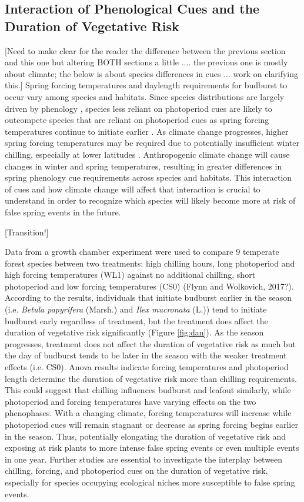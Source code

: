 \documentclass{article}\usepackage[]{graphicx}\usepackage[]{color}
\begin{document}
\subsection{Interaction of Phenological Cues and the Duration of Vegetative Risk}
[Need to make clear for the reader the difference between the previous section and this one but altering BOTH sections a little .... the previous one is mostly about climate; the below is about species differences in cues ... work on clarifying this.]
Spring forcing temperatures and daylength requirements for budburst to occur vary among species and habitats. Since species distributions are largely driven by phenology \citep{Chuine2001}, species less reliant on photoperiod cues are likely to outcompete species that are reliant on photoperiod cues as spring forcing temperatures continue to initiate earlier \citep{Vitasse2011, Gauzere2017}. As climate change progresses, higher spring forcing temperatures may be required due to potentially insufficient winter chilling, especially at lower latitudes \citep{McCreary1990, Morin2009, Fu2012, Polgar2014, Chuine2010}. Anthropogenic climate change will cause changes in winter and spring temperatures, resulting in greater differences in spring phenology cue requirements across species and habitats. This interaction of cues and how climate change will affect that interaction is crucial to understand in order to recognize which species will likely become more at risk of false spring events in the future. 

[Transition!]

Data from a growth chamber experiment were used to compare 9 temperate forest species between two treatments: high chilling hours, long photoperiod and high forcing temperatures (WL1) against no additional chilling, short photoperiod and low forcing temperatures (CS0) (Flynn and Wolkovich, 2017?). According to the results, individuals that initiate budburst earlier in the season (i.e. {\textit {Betula papyrifera}} (Marsh.) and {\textit{Ilex mucronata}} (L.)) tend to initiate budburst early regardless of treatment, but the treatment does affect the duration of vegetative risk significantly (Figure \ref{fig:dan}). As the season progresses, treatment does not affect the duration of vegetative risk as much but the day of budburst tends to be later in the season with the weaker treatment effects (i.e. CS0). Anova results indicate forcing temperatures and photoperiod length determine the duration of vegetative risk more than chilling requirements. This could suggest that chilling influences budburst and leafout similarly, while photoperiod and forcing temperatures have varying effects on the two phenophases. With a changing climate, forcing temperatures will increase while photoperiod cues will remain stagnant or decrease as spring forcing begins earlier in the season. Thus, potentially elongating the duration of vegetative risk and exposing at risk plants to more intense false spring events or even multiple events in one year. Further studies are essential to investigate the interplay between chilling, forcing, and photoperiod cues on the duration of vegetative risk, especially for species occupying ecological niches more susceptible to false spring events. 
\end{document}
